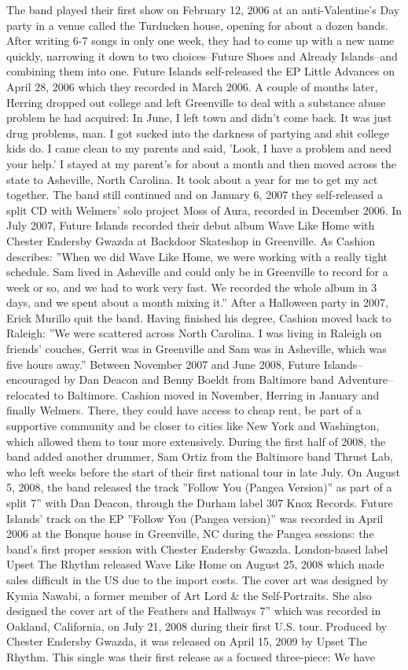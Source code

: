 \documentclass[11pt,a4paper, onecolumn]{article}
\begin{document}
The band played their first show on February 12, 2006 at an anti-Valentine's Day party in a venue called the Turducken house, opening for about a dozen bands. After writing 6-7 songs in only one week, they had to come up with a new name quickly, narrowing it down to two choices--Future Shoes and Already Islands--and combining them into one. Future Islands self-released the EP Little Advances on April 28, 2006 which they recorded in March 2006. A couple of months later, Herring dropped out college and left Greenville to deal with a substance abuse problem he had acquired: In June, I left town and didn't come back. It was just drug problems, man. I got sucked into the darkness of partying and shit college kids do. I came clean to my parents and said, 'Look, I have a problem and need your help.' I stayed at my parent's for about a month and then moved across the state to Asheville, North Carolina. It took about a year for me to get my act together. The band still continued and on January 6, 2007 they self-released a split CD with Welmers' solo project Moss of Aura, recorded in December 2006. In July 2007, Future Islands recorded their debut album Wave Like Home with Chester Endersby Gwazda at Backdoor Skateshop in Greenville. As Cashion describes: ''When we did Wave Like Home, we were working with a really tight schedule. Sam lived in Asheville and could only be in Greenville to record for a week or so, and we had to work very fast. We recorded the whole album in 3 days, and we spent about a month mixing it.'' After a Halloween party in 2007, Erick Murillo quit the band. Having finished his degree, Cashion moved back to Raleigh: ''We were scattered across North Carolina. I was living in Raleigh on friends' couches, Gerrit was in Greenville and Sam was in Asheville, which was five hours away.'' Between November 2007 and June 2008, Future Islands--encouraged by Dan Deacon and Benny Boeldt from Baltimore band Adventure--relocated to Baltimore. Cashion moved in November, Herring in January and finally Welmers. There, they could have access to cheap rent, be part of a supportive community and be closer to cities like New York and Washington, which allowed them to tour more extensively. During the first half of 2008, the band added another drummer, Sam Ortiz from the Baltimore band Thrust Lab, who left weeks before the start of their first national tour in late July. On August 5, 2008, the band released the track ''Follow You (Pangea Version)'' as part of a split 7'' with Dan Deacon, through the Durham label 307 Knox Records. Future Islands' track on the EP ''Follow You (Pangea version)'' was recorded in April 2006 at the Bonque house in Greenville, NC during the Pangea sessions: the band's first proper session with Chester Endersby Gwazda. London-based label Upset The Rhythm released Wave Like Home on August 25, 2008 which made sales difficult in the US due to the import costs. The cover art was designed by Kymia Nawabi, a former member of Art Lord & the Self-Portraits. She also designed the cover art of the Feathers and Hallways 7'' which was recorded in Oakland, California, on July 21, 2008 during their first U.S. tour. Produced by Chester Endersby Gwazda, it was released on April 15, 2009 by Upset The Rhythm. This single was their first release as a focused three-piece: We have 
\end{document}
